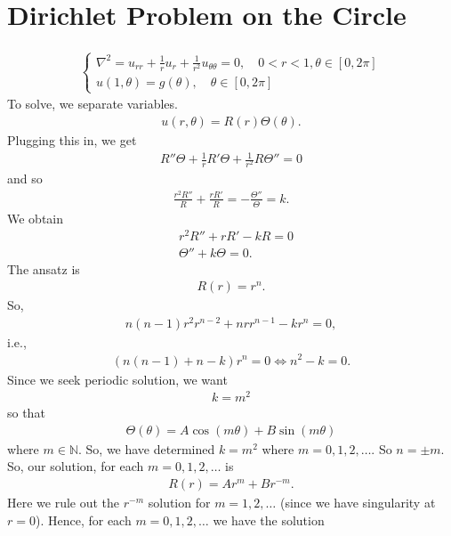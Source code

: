 \documentclass{book}
\theoremstyle{definition}
\newcommand{\f}[2]{\frac{#1}{#2}}
\begin{document}
\newpage

\chapter{Dirichlet Problem on the Circle}

\begin{align*}
\begin{cases}
\nabla^2 = u_{rr} + \frac{1}{r}u_r + \frac{1}{r^2}u_{\theta\theta} = 0, \quad 0<r<1, \theta\in[0,2\pi]\\
u(1,\theta) = g(\theta), \quad \theta \in [0,2\pi]
\end{cases}
\end{align*}
To solve, we separate variables.
\begin{align*}
u(r,\theta) = R(r)\Theta(\theta).
\end{align*}
Plugging this in, we get
\begin{align*}
R''\Theta + \frac{1}{r}R'\Theta + \frac{1}{r^2}R\Theta'' = 0
\end{align*}
and so
\begin{align*}
\f{r^2R''}{R} + \f{rR'}{R} = -\f{\Theta''}{\Theta} = k.
\end{align*}
We obtain 
\begin{align*}
&r^2R'' + rR' - kR = 0\\
&\Theta'' + k\Theta = 0.
\end{align*}
The ansatz is
\begin{align*}
R(r) = r^n.
\end{align*}
So,
\begin{align*}
n(n-1)r^2r^{n-2} + nrr^{n-1} - kr^n = 0,
\end{align*}
i.e.,
\begin{align*}
(n(n-1) + n - k)r^n = 0 \iff n^2 - k = 0.
\end{align*}
Since we seek periodic solution, we want
\begin{align*}
k = m^2
\end{align*}
so that
\begin{align*}
\Theta(\theta) = A\cos(m\theta) + B\sin(m\theta)
\end{align*}
where $m\in\mathbb{N}$. So, we have determined $k = m^2$ where $m=0,1,2,\dots$. So $n = \pm m$. So, our solution, for each $m=0,1,2,\dots$ is
\begin{align*}
R(r) = Ar^m + Br^{-m}.
\end{align*}
Here we rule out the $r^{-m}$ solution for $m=1,2,\dots$ (since we have singularity at $r=0$). Hence, for each $m=0,1,2,\dots$ we have the solution
\end{document}
